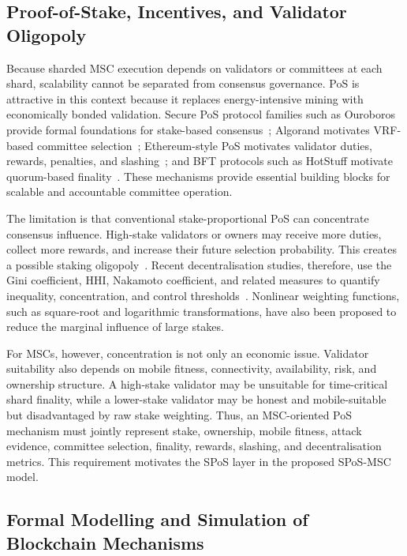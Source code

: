 \documentclass[a4paper,fleqn]{cas-sc}
\begin{document}
\subsection{Proof-of-Stake, Incentives, and Validator Oligopoly}\label{subsec:pos_oligopoly}

Because sharded MSC execution depends on validators or committees at each shard, scalability cannot be separated from consensus governance. PoS is attractive in this context because it replaces energy-intensive mining with economically bonded validation. Secure PoS protocol families such as Ouroboros provide formal foundations for stake-based consensus~\cite{Kiayias2017}; Algorand motivates VRF-based committee selection~\cite{Chen2019b}; Ethereum-style PoS motivates validator duties, rewards, penalties, and slashing~\cite{pititto2022gasper}; and BFT protocols such as HotStuff motivate quorum-based finality~\cite{yin2019hotstuff}. These mechanisms provide essential building blocks for scalable and accountable committee operation.

The limitation is that conventional stake-proportional PoS can concentrate consensus influence. High-stake validators or owners may receive more duties, collect more rewards, and increase their future selection probability. This creates a possible staking oligopoly~\cite{Liu2023Oligopoly,deval2019}. Recent decentralisation studies, therefore, use the Gini coefficient, HHI, Nakamoto coefficient, and related measures to quantify inequality, concentration, and control thresholds~\cite{MENG2023Gini,motepalli2025pos,nakai2024}. Nonlinear weighting functions, such as square-root and logarithmic transformations, have also been proposed to reduce the marginal influence of large stakes.

For MSCs, however, concentration is not only an economic issue. Validator suitability also depends on mobile fitness, connectivity, availability, risk, and ownership structure. A high-stake validator may be unsuitable for time-critical shard finality, while a lower-stake validator may be honest and mobile-suitable but disadvantaged by raw stake weighting. Thus, an MSC-oriented PoS mechanism must jointly represent stake, ownership, mobile fitness, attack evidence, committee selection, finality, rewards, slashing, and decentralisation metrics. This requirement motivates the SPoS layer in the proposed SPoS-MSC model.

\subsection{Formal Modelling and Simulation of Blockchain Mechanisms}\label{subsec:formal_simulation}
\end{document}
